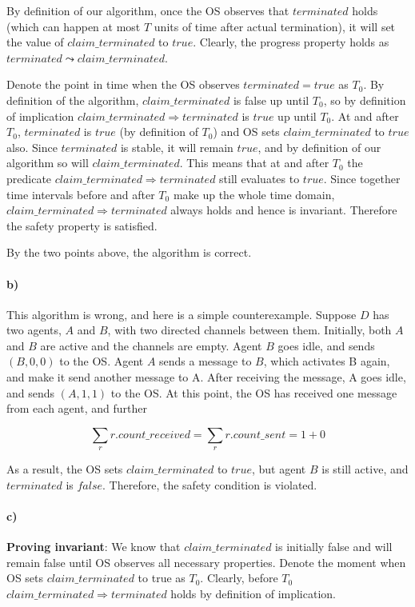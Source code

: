 \documentclass[10pt,letter]{article}
\begin{document}
By definition of our algorithm, once the OS observes that $terminated$ holds (which can happen at most $T$ units of time after actual termination), it will set the value of $claim\_terminated$ to $true$. Clearly, the progress property holds as $terminated \leadsto claim\_terminated$.

Denote the point in time when the OS observes $terminated = true$ as $T_0$. By definition of the algorithm, $claim\_terminated$ is false up until $T_0$, so by definition of implication $claim\_terminated \Rightarrow terminated$ is $true$ up until $T_0$. At and after $T_0$, $terminated$ is $true$ (by definition of $T_0$) and OS sets $claim\_terminated$ to $true$ also. Since $terminated$ is stable, it will remain $true$, and by definition of our algorithm so will $claim\_terminated$. This means that at and after $T_0$ the predicate $claim\_terminated \Rightarrow terminated$ still evaluates to $true$. Since together time intervals before and after $T_0$ make up the whole time domain, $claim\_terminated \Rightarrow terminated$ always holds and hence is invariant. Therefore the safety property is satisfied.

By the two points above, the algorithm is correct.

 \paragraph{b)} This algorithm is wrong, and here is a simple counterexample. Suppose $D$ has two agents, $A$ and $B$, with two directed channels between them. Initially, both $A$ and $B$ are active and the channels are empty. Agent $B$ goes idle, and sends $(B, 0, 0)$ to the OS. Agent $A$ sends a message to $B$, which activates B again, and make it send another message to A. After receiving the message, A goes idle, and sends $(A, 1, 1)$ to the OS. At this point, the OS has received one message from each agent, and further

\[
\sum\limits_{r} r.count\_received = \sum\limits_{r} r.count\_sent = 1 + 0
\]

As a result, the OS sets $claim\_terminated$ to $true$, but agent $B$ is still active, and
$terminated$ is $false$. Therefore, the safety condition is violated.

 \paragraph{c)} \textbf{Proving invariant}: We know that $claim\_terminated$ is initially false and will remain false until OS observes all necessary properties. Denote the moment when OS sets $claim\_terminated$ to true as $T_0$. Clearly, before $T_0$ $claim\_terminated \Rightarrow terminated$ holds by definition of implication.
\end{document}
